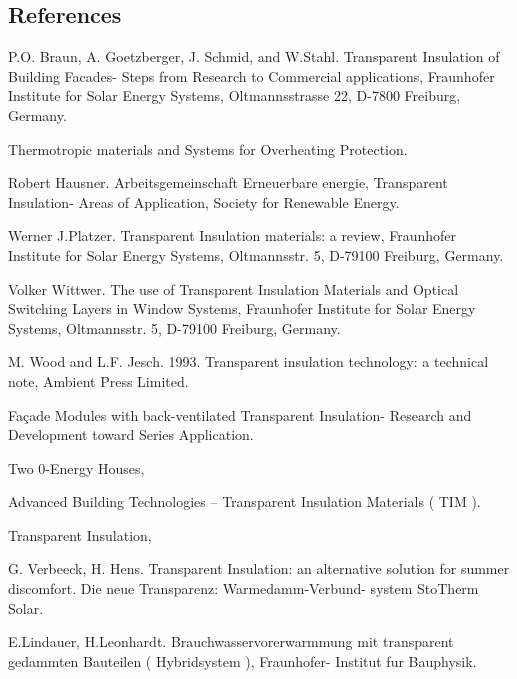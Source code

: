 \subsection{References}\label{references-046}

P.O. Braun, A. Goetzberger, J. Schmid, and W.Stahl. Transparent Insulation of Building Facades- Steps from Research to Commercial applications, Fraunhofer Institute for Solar Energy Systems, Oltmannsstrasse 22, D-7800 Freiburg, Germany.

Thermotropic materials and Systems for Overheating Protection.

Robert Hausner. Arbeitsgemeinschaft Erneuerbare energie, Transparent Insulation- Areas of Application, Society for Renewable Energy.

Werner J.Platzer. Transparent Insulation materials: a review, Fraunhofer Institute for Solar Energy Systems, Oltmannsstr. 5, D-79100 Freiburg, Germany.

Volker Wittwer. The use of Transparent Insulation Materials and Optical Switching Layers in Window Systems, Fraunhofer Institute for Solar Energy Systems, Oltmannsstr. 5, D-79100 Freiburg, Germany.

M. Wood and L.F. Jesch. 1993. Transparent insulation technology: a technical note, Ambient Press Limited.

Façade Modules with back-ventilated Transparent Insulation- Research and Development toward Series Application.

Two 0-Energy Houses,

Advanced Building Technologies -- Transparent Insulation Materials ( TIM ).

Transparent Insulation,

G. Verbeeck, H. Hens. Transparent Insulation: an alternative solution for summer discomfort. Die neue Transparenz: Warmedamm-Verbund- system StoTherm Solar.

E.Lindauer, H.Leonhardt. Brauchwasservorerwarmmung mit transparent gedammten Bauteilen ( Hybridsystem ), Fraunhofer- Institut fur Bauphysik.
